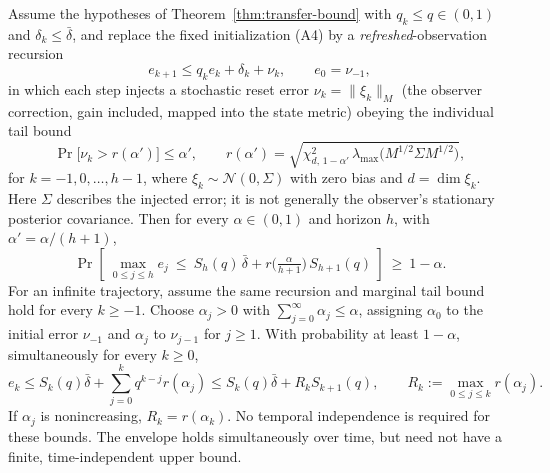\begin{theorem}
\label{thm:prob-transfer}
Assume the hypotheses of Theorem~\ref{thm:transfer-bound} with $q_k\le q\in(0,1)$ and $\delta_k\le\bar\delta$, and replace the fixed initialization (A4) by a \emph{refreshed}-observation recursion
\begin{equation}
  e_{k+1}\le q_k e_k+\delta_k+\nu_k,\qquad e_0=\nu_{-1},
  \label{eq:prob-recursion}
\end{equation}
in which each step injects a stochastic reset error $\nu_k=\lVert\xi_k\rVert_{M}$ (the observer correction, gain included, mapped into the state metric) obeying the individual tail bound
\[
  \Pr\bigl[\nu_k>r(\alpha')\bigr]\le\alpha',
  \qquad
  r(\alpha')=\sqrt{\chi^2_{d,\,1-\alpha'}\,\lambda_{\max}\!\bigl(M^{1/2}\Sigma M^{1/2}\bigr)},
\]
for $k=-1,0,\dots,h-1$, where $\xi_k\sim\mathcal N(0,\Sigma)$ with zero bias and $d=\dim\xi_k$. Here $\Sigma$ describes the injected error; it is not generally the observer's stationary posterior covariance. Then for every $\alpha\in(0,1)$ and horizon $h$, with $\alpha'=\alpha/(h+1)$,
\begin{equation}
  \Pr\!\left[\ \max_{0\le j\le h}e_j\ \le\ S_h(q)\,\bar\delta+r\!\bigl(\tfrac{\alpha}{h+1}\bigr)\,S_{h+1}(q)\ \right]\ \ge\ 1-\alpha.
  \label{eq:prob-transfer}
\end{equation}
For an infinite trajectory, assume the same recursion and marginal tail bound
hold for every $k\ge-1$. Choose $\alpha_j>0$ with
$\sum_{j=0}^{\infty}\alpha_j\le\alpha$, assigning $\alpha_0$ to the initial
error $\nu_{-1}$ and $\alpha_j$ to $\nu_{j-1}$ for $j\ge1$. With probability
at least $1-\alpha$, simultaneously for every $k\ge0$,
\begin{equation}
 e_k\le S_k(q)\bar\delta+
       \sum_{j=0}^{k}q^{k-j}r(\alpha_j)
 \le S_k(q)\bar\delta+R_kS_{k+1}(q),
 \qquad R_k:=\max_{0\le j\le k}r(\alpha_j).
 \label{eq:prob-transfer-infinite}
\end{equation}
If $\alpha_j$ is nonincreasing, $R_k=r(\alpha_k)$. No temporal independence
is required for these bounds. The envelope holds simultaneously over time,
but need not have a finite, time-independent upper bound.
\end{theorem}

